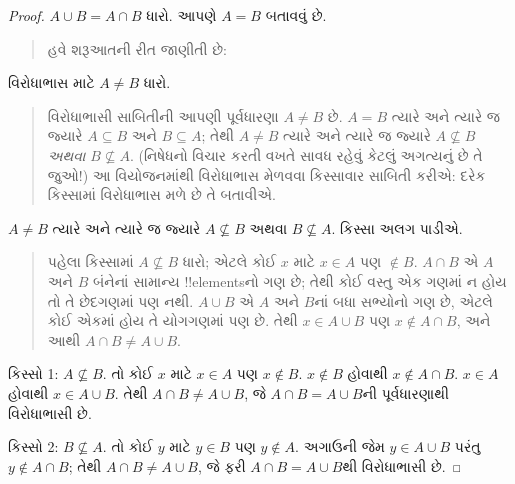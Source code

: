 \documentclass[../../../include/open-logic-section]{subfiles}
\begin{document}
\begin{proof}
  $A \cup B = A \cap B$ ધારો. આપણે $A = B$ બતાવવું છે.
  \begin{quote}
    હવે શરૂઆતની રીત જાણીતી છે:
  \end{quote}
  વિરોધાભાસ માટે $A \neq B$ ધારો.
  \begin{quote}
    વિરોધાભાસી સાબિતીની આપણી પૂર્વધારણા $A \neq
    B$ છે. $A = B$ ત્યારે અને ત્યારે જ જ્યારે $A \subseteq B$
    અને $B \subseteq A$; તેથી $A \neq B$ ત્યારે અને ત્યારે જ
    જ્યારે $A \nsubseteq B$ \emph{અથવા} $B \nsubseteq
    A$. (નિષેધનો વિચાર કરતી વખતે સાવધ રહેવું કેટલું અગત્યનું
    છે તે જુઓ!{}) આ વિયોજનમાંથી વિરોધાભાસ મેળવવા કિસ્સાવાર
    સાબિતી કરીએ: દરેક કિસ્સામાં વિરોધાભાસ મળે છે તે બતાવીએ.
  \end{quote}
  $A \neq B$ ત્યારે અને ત્યારે જ જ્યારે $A \nsubseteq B$ અથવા
  $B \nsubseteq A$. કિસ્સા અલગ પાડીએ.
  \begin{quote}
    પહેલા કિસ્સામાં $A \nsubseteq B$ ધારો; એટલે કોઈ $x$
    માટે $x \in A$ પણ $\notin B$. $A \cap B$ એ $A$ અને
    $B$ બંનેનાં સામાન્ય !!{element}sનો ગણ છે; તેથી કોઈ
    વસ્તુ એક ગણમાં ન હોય તો તે છેદગણમાં પણ નથી. $A \cup B$
    એ $A$ અને $B$નાં બધા સભ્યોનો ગણ છે, એટલે કોઈ એકમાં
    હોય તે યોગગણમાં પણ છે. તેથી $x \in A \cup B$ પણ
    $x \notin A \cap
    B$, અને આથી $A \cap B \neq A \cup B$.
  \end{quote}

  કિસ્સો 1: $A \nsubseteq B$. તો કોઈ $x$ માટે $x \in A$
  પણ $x \notin
  B$. $x \notin B$ હોવાથી $x \notin A \cap B$. $x \in A$
  હોવાથી $x \in A \cup B$. તેથી $A \cap B \neq A \cup B$,
  જે $A \cap B = A \cup B$ની પૂર્વધારણાથી વિરોધાભાસી છે.

  કિસ્સો 2: $B \nsubseteq A$. તો કોઈ $y$ માટે $y \in B$
  પણ $y \notin
  A$. અગાઉની જેમ $y \in A \cup B$ પરંતુ $y \notin A \cap B$;
  તેથી $A \cap B \neq A \cup B$, જે ફરી $A \cap B = A \cup
  B$થી વિરોધાભાસી છે.
\end{proof}
\end{document}
